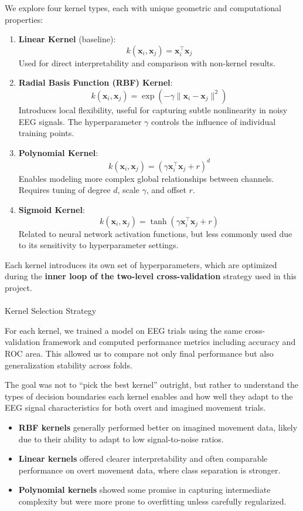 \documentclass[
  letterpaper,
  DIV=11,
  numbers=noendperiod]{scrartcl}
\makeatletter
\let\oldparagraph\paragraph
\renewcommand{\paragraph}{
    \@ifstar
      \xxxParagraphStar
      \xxxParagraphNoStar
  }
\newcommand{\xxxParagraphStar}[1]{\oldparagraph*{#1}\mbox{}}
\newcommand{\xxxParagraphNoStar}[1]{\oldparagraph{#1}\mbox{}}
\providecommand{\tightlist}{%
  \setlength{\itemsep}{0pt}\setlength{\parskip}{0pt}}\usepackage{longtable,booktabs,array}
\makeatother
\begin{document}
We explore four kernel types, each with unique geometric and
computational properties:

\begin{enumerate}
\def\labelenumi{\arabic{enumi}.}
\item
  \textbf{Linear Kernel} (baseline): \[
  k(\mathbf{x}_i, \mathbf{x}_j) = \mathbf{x}_i^\top \mathbf{x}_j
  \] Used for direct interpretability and comparison with non-kernel
  results.
\item
  \textbf{Radial Basis Function (RBF) Kernel}: \[
  k(\mathbf{x}_i, \mathbf{x}_j) = \exp(-\gamma \|\mathbf{x}_i - \mathbf{x}_j\|^2)
  \] Introduces local flexibility, useful for capturing subtle
  nonlinearity in noisy EEG signals. The hyperparameter \(\gamma\)
  controls the influence of individual training points.
\item
  \textbf{Polynomial Kernel}: \[
  k(\mathbf{x}_i, \mathbf{x}_j) = (\gamma \mathbf{x}_i^\top \mathbf{x}_j + r)^d
  \] Enables modeling more complex global relationships between
  channels. Requires tuning of degree \(d\), scale \(\gamma\), and
  offset \(r\).
\item
  \textbf{Sigmoid Kernel}: \[
  k(\mathbf{x}_i, \mathbf{x}_j) = \tanh(\gamma \mathbf{x}_i^\top \mathbf{x}_j + r)
  \] Related to neural network activation functions, but less commonly
  used due to its sensitivity to hyperparameter settings.
\end{enumerate}

Each kernel introduces its own set of hyperparameters, which are
optimized during the \textbf{inner loop of the two-level
cross-validation} strategy used in this project.

\paragraph{Kernel Selection Strategy}\label{kernel-selection-strategy}

For each kernel, we trained a model on EEG trials using the same
cross-validation framework and computed performance metrics including
accuracy and ROC area. This allowed us to compare not only final
performance but also generalization stability across folds.

The goal was not to ``pick the best kernel'' outright, but rather to
understand the types of decision boundaries each kernel enables and how
well they adapt to the EEG signal characteristics for both overt and
imagined movement trials.

\begin{itemize}
\tightlist
\item
  \textbf{RBF kernels} generally performed better on imagined movement
  data, likely due to their ability to adapt to low signal-to-noise
  ratios.
\item
  \textbf{Linear kernels} offered clearer interpretability and often
  comparable performance on overt movement data, where class separation
  is stronger.
\item
  \textbf{Polynomial kernels} showed some promise in capturing
  intermediate complexity but were more prone to overfitting unless
  carefully regularized.
\end{itemize}
\end{document}
